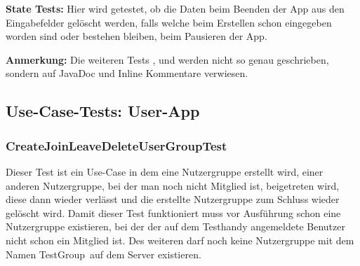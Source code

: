 \textbf{State Tests:} Hier wird getestet, ob die Daten beim Beenden der App aus den Eingabefelder gelöscht werden, falls welche beim Erstellen schon eingegeben worden sind oder bestehen bleiben, beim Pausieren der App.

\textbf{Anmerkung:} Die weiteren Tests ,  und  werden nicht so genau geschrieben, sondern auf JavaDoc und Inline Kommentare verwiesen.


\subsection{Use-Case-Tests: User-App}
\subsubsection{CreateJoinLeaveDeleteUserGroupTest}
Dieser Test ist ein Use-Case in dem eine Nutzergruppe erstellt wird, einer anderen Nutzergruppe, bei der man noch nicht Mitglied ist, beigetreten wird, diese dann wieder verlässt und die erstellte Nutzergruppe zum Schluss wieder gelöscht wird. Damit dieser Test funktioniert muss vor Ausführung schon eine Nutzergruppe existieren, bei der der auf dem Testhandy angemeldete Benutzer nicht schon ein Mitglied ist. Des weiteren darf noch keine Nutzergruppe mit dem Namen \glqq TestGroup\grqq\ auf dem Server existieren.

